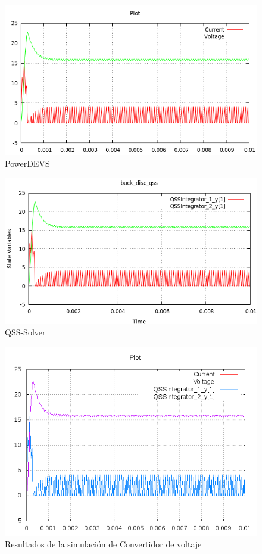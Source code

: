 \begin{figure}[H]
\begin{minipage}{0.5\textwidth}
 \includegraphics[width=\linewidth]{buck_disk-pd}
\centering
PowerDEVS
\end{minipage}\hfill
\begin{minipage}{0.5\textwidth}
 \includegraphics[width=\linewidth]{buck_disk-qss}
\centering
QSS-Solver
\end{minipage}
\includegraphics[width=\textwidth]{output/buck_disk/buck_disk-all}
\caption{Resultados de la simulación de Convertidor de voltaje}
\label{result:buckdisk}
\end{figure}


